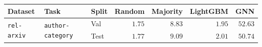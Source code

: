 \begin{tabular}{lllrrrr}
\toprule
Dataset & Task & Split & Random & Majority & LightGBM & GNN \\
\midrule
\multirow[c]{2}{*}{\texttt{rel-arxiv}} & \multirow[c]{2}{*}{\texttt{author-category}} & Val & $1.75$ & $8.83$ & $1.95$ & $\bm{52.63}$ \\
 &  & Test & $1.77$ & $9.09$ & $2.01$ & $\bm{50.74}$ \\
\bottomrule
\end{tabular}
